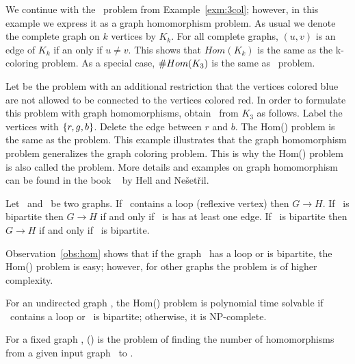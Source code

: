 \begin{example}[\tcoloring]
We continue with the \tcoloring\ problem from Example~\ref{exm:3col}; however, in this example 
we express it as a graph homomorphism problem. As usual we denote the complete graph
on \(k\) vertices by \(K_k\)\@. For all complete graphs, \((u,v)\) is an edge of \(K_k\)
if an only
if \(u\neq v\)\@. This shows that \(Hom(K_k)\) is the same as
the k-coloring problem. As a special case, \(\#Hom(K_3)\) is the same as \ctcol\ problem.
\end{example}

Let  be the  problem with an additional
restriction that the vertices colored blue are not allowed to be connected 
to the vertices colored red. In order to formulate this problem with graph homomorphisms,
obtain \mH\ from \(K_3\) as follows. Label the vertices with \(\{{r,g,b}\}\)\@.
Delete the edge between \(r\) and \(b\). The Hom(\mH) problem is the same as
the  problem.
This example illustrates that the graph homomorphism problem generalizes the graph coloring problem.
This is why
the Hom(\mH) problem is also called the  problem.
More details and examples on graph homomorphism 
can be found in the book ~\cite{hellbook} by Hell and Ne\v{s}et\v{r}il.

\begin{obs}\label{obs:hom}
Let \mG\ and \mH\ be two graphs.
If \mH\ contains a loop (reflexive vertex) then \(G \to H\)\@.
If \mG\ is bipartite then \(G \to H\) if and only if \mH\ is has at least one edge.
If \mH\ is bipartite then \(G \to H\) if and only if \mG\ is bipartite.
\end{obs}

Observation~\ref{obs:hom} shows that if the graph \mH\ has a loop or is bipartite,
the Hom(\mH) problem is easy; however, for other graphs the problem is of higher complexity.

\begin{theorem}  \label{thrm:pavol}
For an undirected graph \mH, the Hom(\mH) problem is polynomial time solvable if 
\mH\ contains a loop or \mH\ is bipartite; otherwise, it is NP-complete.
\end{theorem}

\begin{defi}[\chom(\mH)]
For a fixed graph \mH,
\chom(\mH) is the problem of finding the number of homomorphisms from a given 
input graph \mG\ to \mH.
\end{defi}

